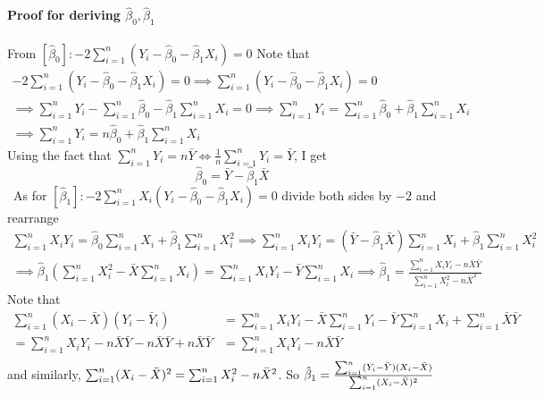 \documentclass[12pt]{article}
\theoremstyle{definition}
\theoremstyle{property}
\theoremstyle{assumption}
\theoremstyle{example}
\theoremstyle{comment}
\begin{document}
\begin{mdframed}[backgroundcolor=blue!5] 
\textbf{Proof for deriving $\hat{\beta}_0,\hat{\beta}_1$}
\\ \\
\footnotesize{From $[\hat{\beta}_0]: -2\sum_{i=1}^n(Y_i-\hat{\beta}_0-\hat{\beta}_1X_i)=0$ Note that 
\begin{gather*}
-2\sum_{i=1}^n(Y_i-\hat{\beta}_0-\hat{\beta}_1X_i)=0 \implies \sum_{i=1}^n(Y_i-\hat{\beta}_0-\hat{\beta}_1X_i)=0 \\
\implies  \sum_{i=1}^n Y_i -\sum_{i=1}^n\hat{\beta}_0 -\hat{\beta}_1\sum_{i=1}^nX_i =0 \implies  \sum_{i=1}^n Y_i =\sum_{i=1}^n\hat{\beta}_0 +\hat{\beta}_1\sum_{i=1}^nX_i \\
\implies  \sum_{i=1}^n Y_i =n\hat{\beta}_0 +\hat{\beta}_1\sum_{i=1}^nX_i
\end{gather*}
Using the fact that $\sum_{i=1}^n Y_i = n\bar{Y} \iff \frac{1}{n}\sum_{i=1}^n Y_i = \bar{Y}$, I get
\[
\hat{\beta}_0=\bar{Y}-\hat{\beta}_1\bar{X}
\]\
As for $[\hat{\beta}_1]: -2\sum_{i=1}^nX_i(Y_i-\hat{\beta}_0-\hat{\beta}_1X_i)=0$ divide both sides by $-2$ and rearrange
\begin{gather*}
\sum_{i=1}^nX_iY_i=\hat{\beta}_0\sum_{i=1}^nX_i +\hat{\beta}_1\sum_{i=1}^nX_i^2\implies \sum_{i=1}^nX_iY_i=(\bar{Y}-\hat{\beta}_1\bar{X})\sum_{i=1}^nX_i +\hat{\beta}_1\sum_{i=1}^nX_i^2\\
\implies\hat{\beta}_1\left(\sum_{i=1}^nX_i^2-\bar{X}\sum_{i=1}^nX_i\right)=\sum_{i=1}^nX_iY_i-\bar{Y}\sum_{i=1}^nX_i
\implies \hat{\beta}_1 = \frac{\sum_{i=1}^nX_iY_i - n\bar{X}\bar{Y}}{\sum_{i=1}^nX_i^2-n{\bar{X}}^2}
\end{gather*}
Note that 
\[
\begin{aligned}
\sum_{i=1}^n(X_i-\bar{X})(Y_i-\bar{Y}_i) &= \sum_{i=1}^nX_iY_i - \bar{X}\sum_{i=1}^nY_i -\bar{Y}\sum_{i=1}^nX_i +\sum_{i=1}^n\bar{X}\bar{Y} \\
=\sum_{i=1}^nX_iY_i - n\bar{X}\bar{Y} -n\bar{X}\bar{Y} +n\bar{X}\bar{Y} &= \sum_{i=1}^nX_iY_i - n\bar{X}\bar{Y} \\
 \end{aligned}
\]}\normalsize
and similarly, $\footnotesize{\sum_{i=1}^n(X_i-\bar{X})^2 = \sum_{i=1}^nX_i^2-n{\bar{X}}^2}\normalsize$. So $\footnotesize{
\hat{\beta}_1=\frac{\sum_{i=1}^n(Y_i-\bar{Y})(X_i-\bar{X})}{\sum_{i=1}^n(X_i-\bar{X})^2}
}$\normalsize
\end{mdframed}
\par
\end{document}
